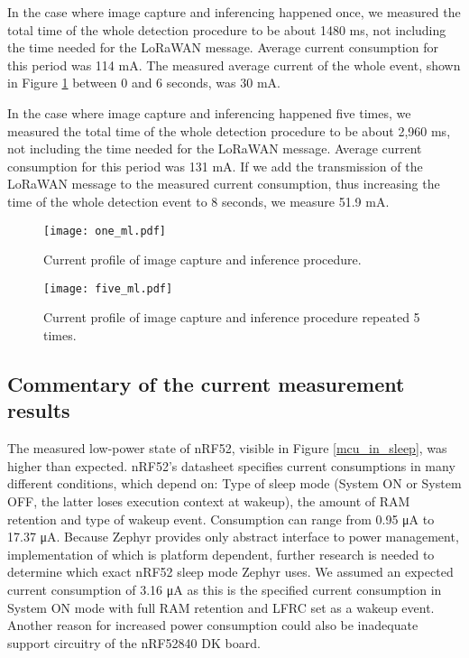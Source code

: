 In the case where image capture and inferencing happened once, we measured the total time of the whole detection procedure to be about 1480 \si{\milli\second}, not including the time needed for the LoRaWAN message.
Average current consumption for this period was 114 \si{\milli\ampere}.
The measured average current of the whole event, shown in Figure \ref{one_ml} between 0 and 6 seconds, was 30 \si{\milli\ampere}.

In the case where image capture and inferencing happened five times, we measured the total time of the whole detection procedure to be about 2,960 \si{\milli\second}, not including the time needed for the LoRaWAN message.
Average current consumption for this period was 131 \si{\milli\ampere}.
If we add the transmission of the LoRaWAN message to the measured current consumption, thus increasing the time of the whole detection event to 8 seconds, we measure 51.9 \si{\milli\ampere}.

\begin{figure}[ht]
    \centering
    \texttt{[image: one\_ml.pdf]}
    \caption{ Current profile of image capture and inference procedure.}
    \label{one_ml}
\end{figure}
\begin{figure}[ht]
    \centering
    \texttt{[image: five\_ml.pdf]}
    \caption{ Current profile of image capture and inference procedure repeated 5 times.}
    \label{five_ml}
\end{figure}

\subsection{ Commentary of the current measurement results}

The measured low-power state of nRF52, visible in Figure \ref{mcu_in_sleep}, was higher than expected.
nRF52's datasheet\cite{nrf52_datasheet} specifies current consumptions in many different conditions, which depend on: Type of sleep mode (System ON or System OFF, the latter loses execution context at wakeup), the amount of RAM retention and type of wakeup event.
Consumption can range from 0.95 \si{\micro\ampere} to 17.37 \si{\micro\ampere}.
Because Zephyr provides only abstract interface to power management, implementation of which is platform dependent, further research is needed to determine which exact nRF52 sleep mode Zephyr uses.
We assumed an expected current consumption of 3.16 \si{\micro\ampere} as this is the specified current consumption in System ON mode with full RAM retention and LFRC set as a wakeup event.
Another reason for increased power consumption could also be inadequate support circuitry of the nRF52840 DK board.

